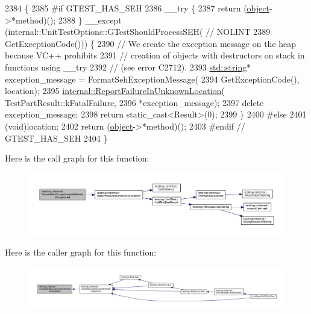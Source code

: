 \begin{DoxyCode}
2384                                                           \{
2385 \textcolor{preprocessor}{#if GTEST\_HAS\_SEH}
2386   \_\_try \{
2387     \textcolor{keywordflow}{return} (\hyperlink{classobject}{object}->*method)();
2388   \} \_\_except (internal::UnitTestOptions::GTestShouldProcessSEH(  \textcolor{comment}{// NOLINT}
2389       GetExceptionCode())) \{
2390     \textcolor{comment}{// We create the exception message on the heap because VC++ prohibits}
2391     \textcolor{comment}{// creation of objects with destructors on stack in functions using \_\_try}
2392     \textcolor{comment}{// (see error C2712).}
2393     \hyperlink{namespacetesting_1_1internal_a8e8ff5b11e64078831112677156cb111}{std::string}* exception\_message = FormatSehExceptionMessage(
2394         GetExceptionCode(), location);
2395     \hyperlink{namespacetesting_1_1internal_a85f6ff0e40f9a5f10af66a73cf1364fa}{internal::ReportFailureInUnknownLocation}(
      TestPartResult::kFatalFailure,
2396                                              *exception\_message);
2397     \textcolor{keyword}{delete} exception\_message;
2398     \textcolor{keywordflow}{return} \textcolor{keyword}{static\_cast<}Result\textcolor{keyword}{>}(0);
2399   \}
2400 \textcolor{preprocessor}{#else}
2401   (void)location;
2402   \textcolor{keywordflow}{return} (\hyperlink{classobject}{object}->*method)();
2403 \textcolor{preprocessor}{#endif  // GTEST\_HAS\_SEH}
2404 \}
\end{DoxyCode}
Here is the call graph for this function\+:
\nopagebreak
\begin{figure}[H]
\begin{center}
\leavevmode
\includegraphics[width=350pt]{namespacetesting_1_1internal_ac5293b438139ef7ed05cb7fcaaf63545_cgraph}
\end{center}
\end{figure}
Here is the caller graph for this function\+:
\nopagebreak
\begin{figure}[H]
\begin{center}
\leavevmode
\includegraphics[width=350pt]{namespacetesting_1_1internal_ac5293b438139ef7ed05cb7fcaaf63545_icgraph}
\end{center}
\end{figure}
\mbox{\label{namespacetesting_1_1internal_a6fff795269f50673e358438721710d6f}} 
